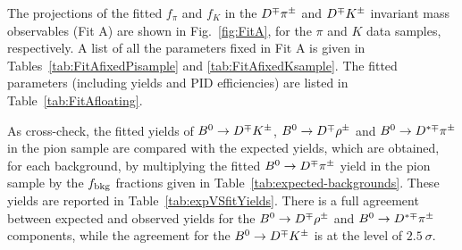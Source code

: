 The projections of the fitted $f_{\pi}$ and $f_{K}$ in the $D^\mp\pi^\pm$ and
$D^\mp K^\pm$ invariant mass observables (Fit A) are shown in Fig.~\ref{fig:FitA}, for 
the $\pi$ and $K$ data samples, respectively. A list of all the parameters fixed in
Fit A is given in Tables~\ref{tab:FitAfixedPisample} and \ref{tab:FitAfixedKsample}. The
fitted parameters (including yields and PID efficiencies) are listed in
Table~\ref{tab:FitAfloating}. 

As cross-check, the fitted yields of $B^0\rightarrow D^\mp K^\pm$, $B^0\rightarrow D^\mp\rho^\pm$ and $B^0\rightarrow
D^{*\mp}\pi^\pm$ in the pion sample are compared with the expected yields,
which are obtained, for each background,
by multiplying the fitted $B^0\rightarrow D^\mp\pi^\pm$ yield in the pion sample by the $f_{\rm
bkg}$ fractions given in Table~\ref{tab:expected-backgrounds}. 
These yields are reported in Table~\ref{tab:expVSfitYields}. There is 
a full agreement between expected and observed yields for the $B^0\rightarrow D^\mp\rho^\pm$ and
$B^0\rightarrow D^{*\mp}\pi^\pm$ components, while the agreement for the $B^0\rightarrow D^\mp K^\pm$ is at the level of $2.5~\sigma$.

